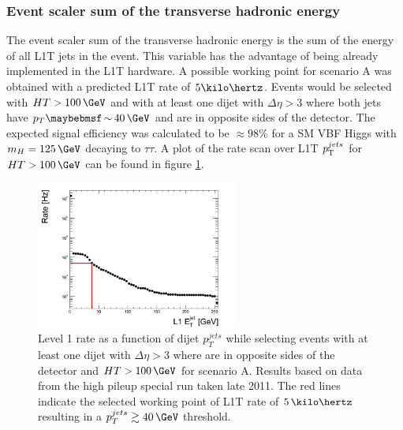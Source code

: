 \subsubsection{Event scaler sum of the transverse hadronic energy}


The event scaler sum of the transverse hadronic energy is the sum of the energy of all \gls{L1T} jets in the event. This variable has the advantage of being already implemented in the \gls{L1T} hardware. A possible working point for scenario A was obtained with a predicted \gls{L1T} rate of $5\kilo\hertz$. Events would be selected with $HT>100\,\GeV$ and with at least one dijet with $\Delta\eta>3$ where both jets have $p_T \sim 40\,\GeV$ and are in opposite sides of the detector. The expected signal efficiency was calculated to be $\approx 98\%$ for a \gls{SM} \gls{VBF} Higgs with $m_H=125\,\GeV$ decaying to $\tau\tau$. A plot of the rate scan over \gls{L1T} $p_{\mathrm{T}}^{jets}$ for $HT>100\,\GeV$ can be found in figure \ref{FIGURE:ParkedDataAnalysis_ParkedTriggerDevelopment_PU28_5e33_RateFBDijetDEtaDPhi00HT100}.

\begin{figure}[ht]
\centering
\includegraphics[width=0.60\textwidth]{Chapter07/ParkedDataTriggerDevelopment/Images/PU28_5e33_RateFBDijetDEtaDPhi00HT100.png}
\caption{Level 1 rate as a function of dijet $p_T^{jets}$ while selecting events with at least one dijet with $\Delta\eta>3$ where are in opposite sides of the detector and $HT>100\,\GeV$ for scenario A. Results based on data from the high pileup special run taken late 2011. The red lines indicate the selected working point of \gls{L1T} rate of $5\,\kilo\hertz$ resulting in a $p_T^{jets} \gtrsim 40\,\GeV$ threshold.}
\label{FIGURE:ParkedDataAnalysis_ParkedTriggerDevelopment_PU28_5e33_RateFBDijetDEtaDPhi00HT100}
\end{figure}

